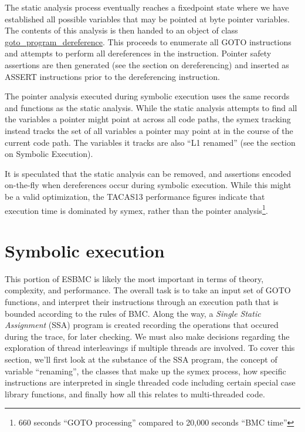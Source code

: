 \documentclass{article}
\begin{document}
The static analysis process eventually reaches a fixedpoint state where we
have established all possible variables that may be pointed at byte pointer
variables. The contents of this analysis is then handed to an object of
class \url{goto_program_dereference}. This proceeds to enumerate all
GOTO instructions and attempts to perform all dereferences in the instruction.
Pointer safety assertions are then generated (see the section on dereferencing)
and inserted as ASSERT instructions prior to the dereferencing instruction.

The pointer analysis executed during symbolic execution uses the same records
and functions as the static analysis. While the static analysis attempts to find
all the variables a pointer might point at across all code paths, the symex
tracking instead tracks the set of all variables a pointer may point at in the
course of the current code path. The variables it tracks are also ``L1 renamed''
(see the section on Symbolic Execution).

It is speculated that the static analysis can be removed, and assertions
encoded on-the-fly when dereferences occur during symbolic execution. While
this might be a valid optimization, the TACAS13 performance figures indicate
that execution time is dominated by symex, rather than the pointer
analysis\footnote{660 seconds ``GOTO processing'' compared to 20,000 seconds
``BMC time''}.

\section{Symbolic execution}

This portion of ESBMC is likely the most important in terms of theory,
complexity, and performance. The overall task is to take an input set of
GOTO functions, and interpret their instructions through an execution path
that is bounded according to the rules of BMC. Along the way, a \textit{Single
Static Assignment} (SSA) program is created recording the operations that
occured during the trace, for later checking. We must also make decisions
regarding the exploration of thread interleavings if multiple threads are
involved. To cover this section, we'll first look at the substance of the
SSA program, the concept of variable ``renaming'', the classes that make up
the symex process, how specific instructions are interpreted in single
threaded code including certain special case library functions,
and finally how all this relates to multi-threaded code.
\end{document}
